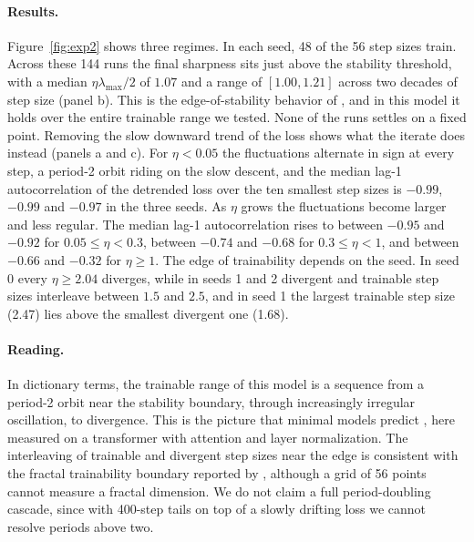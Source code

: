 \paragraph{Results.} Figure~\ref{fig:exp2} shows three regimes. In each seed, 48 of the 56 step sizes train. Across these 144 runs the final sharpness sits just above the stability threshold, with a median $\eta\lambda_{\max}/2$ of $1.07$ and a range of $[1.00,1.21]$ across two decades of step size (panel b). This is the edge-of-stability behavior of \citet{cohen2021gradient}, and in this model it holds over the entire trainable range we tested. None of the runs settles on a fixed point. Removing the slow downward trend of the loss shows what the iterate does instead (panels a and c). For $\eta<0.05$ the fluctuations alternate in sign at every step, a period-2 orbit riding on the slow descent, and the median lag-1 autocorrelation of the detrended loss over the ten smallest step sizes is $-0.99$, $-0.99$ and $-0.97$ in the three seeds. As $\eta$ grows the fluctuations become larger and less regular. The median lag-1 autocorrelation rises to between $-0.95$ and $-0.92$ for $0.05\le\eta<0.3$, between $-0.74$ and $-0.68$ for $0.3\le\eta<1$, and between $-0.66$ and $-0.32$ for $\eta\ge1$. The edge of trainability depends on the seed. In seed 0 every $\eta\ge2.04$ diverges, while in seeds 1 and 2 divergent and trainable step sizes interleave between $1.5$ and $2.5$, and in seed 1 the largest trainable step size (2.47) lies above the smallest divergent one (1.68).

\paragraph{Reading.} In dictionary terms, the trainable range of this model is a sequence from a period-2 orbit near the stability boundary, through increasingly irregular oscillation, to divergence. This is the picture that minimal models predict \citep{chen2022edge,zhu2022edgeofstability,kong2020stochasticity}, here measured on a transformer with attention and layer normalization. The interleaving of trainable and divergent step sizes near the edge is consistent with the fractal trainability boundary reported by \citet{sohldickstein2024boundary}, although a grid of 56 points cannot measure a fractal dimension. We do not claim a full period-doubling cascade, since with 400-step tails on top of a slowly drifting loss we cannot resolve periods above two.

